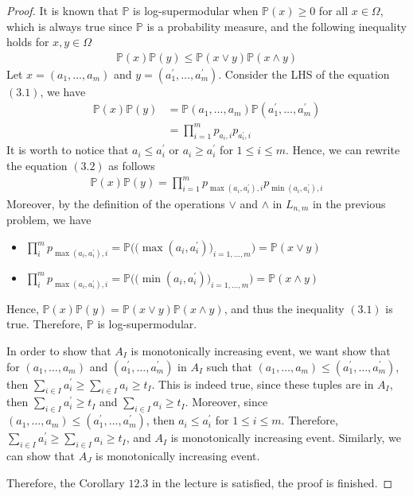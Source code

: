 \begin{proof}
  It is known that $\mathbb{P}$ is log-supermodular when $\mathbb{P}(x) \geq 0$ for all $x \in \Omega$, which is always true since $\mathbb{P}$ is a probability measure, and the following inequality holds for $x,y \in \Omega$
  \begin{align*}
    \mathbb{P}(x)\mathbb{P}(y) \leq \mathbb{P}(x \vee y) \mathbb{P}(x \wedge y) \tag{3.1}
  \end{align*}
  Let $x = (a_{1},\ldots,a_{m})$ and $y = (a_{1}^{'},\ldots,a_{m}^{'})$. Consider the LHS of the equation $(3.1)$, we have
  \begin{align*}
    \mathbb{P}(x)\mathbb{P}(y) &= \mathbb{P}(a_{1},\ldots,a_{m}) \mathbb{P}(a_{1}^{'},\ldots,a_{m}^{'}) \\
                               &= \prod\limits_{i=1}^{m} p_{a_{i},i} p_{a_{i}^{'},i} \tag{3.2}
  \end{align*}
  It is worth to notice that $a_{i} \leq a_{i}^{'}$ or $a_{i} \geq a_{i}^{'}$ for $1 \leq i \leq m$. Hence, we can rewrite the equation $(3.2)$ as follows 
  \begin{align*}
    \mathbb{P}(x)\mathbb{P}(y) = \prod\limits_{i=1}^{m} p_{\max(a_{i},a_{i}^{'}),i} p_{\min(a_{i},a_{i}^{'}),i} \tag{3.3}
  \end{align*}
  Moreover, by the definition of the operations $\vee$ and $\wedge$ in $L_{n,m}$ in the previous problem, we have
  \begin{itemize}
    \item $\prod\limits_{i}^{m} p_{\max(a_{i},a_{i}^{'}),i} = \mathbb{P} \Big( \big(\max(a_{i},a_{i}^{'})\big)_{i=1,\ldots,m} \Big) = \mathbb{P}(x \vee y)$
    \item $\prod\limits_{i}^{m} p_{\max(a_{i},a_{i}^{'}),i} = \mathbb{P} \Big( \big(\min(a_{i},a_{i}^{'})\big)_{i=1,\ldots,m} \Big) = \mathbb{P}(x \wedge y)$
  \end{itemize}
  Hence, $\mathbb{P}(x)\mathbb{P}(y) = \mathbb{P}(x \vee y) \mathbb{P}(x \wedge y)$, and thus the inequality $(3.1)$ is true. Therefore, $\mathbb{P}$ is log-supermodular. 

  In order to show that $A_{I}$ is monotonically increasing event, we want show that for $(a_{1},\ldots,a_{m})$ and $(a_{1}^{'},\ldots,a_{m}^{'})$ in $A_{I}$ such that $(a_{1},\ldots,a_{m}) \leq (a_{1}^{'},\ldots,a_{m}^{'})$, then $\sum\limits_{i \in I} a_{i}^{'} \geq \sum\limits_{i \in I} a_{i} \geq t_{I}$. This is indeed true, since these tuples are in $A_{I}$, then $\sum\limits_{i \in I} a_{i}^{'} \geq t_{I}$ and $\sum\limits_{i \in I} a_{i} \geq t_{I}$. Moreover, since $(a_{1},\ldots,a_{m}) \leq (a_{1}^{'},\ldots,a_{m}^{'})$, then $a_{i} \leq a_{i}^{'}$ for $1 \leq i \leq m$. Therefore, $\sum\limits_{i \in I} a_{i}^{'} \geq \sum\limits_{i \in I} a_{i} \geq t_{I}$, and $A_{I}$ is monotonically increasing event. Similarly, we can show that $A_{J}$ is monotonically increasing event.

  Therefore, the Corollary $12.3$ in the lecture is satisfied, the proof is finished.
\end{proof}
